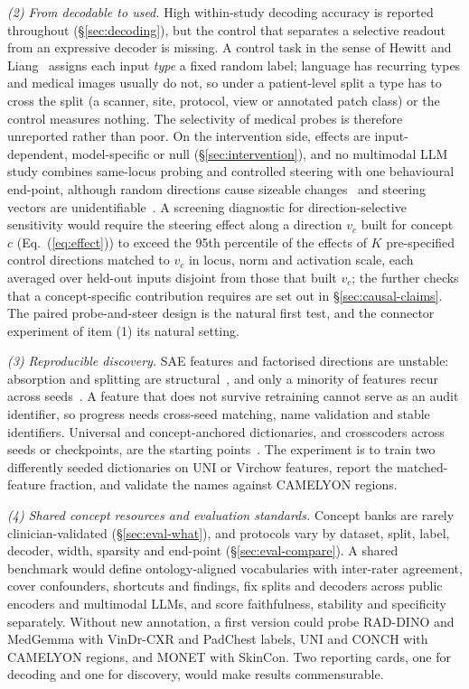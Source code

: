 \textit{(2) From decodable to used.} High within-study decoding accuracy is reported throughout
(\S\ref{sec:decoding}), but the control that separates a selective readout from an expressive decoder
is missing. A control task in the sense of Hewitt and Liang~\cite{hewitt2019designing} assigns each
input \emph{type} a fixed random label; language has recurring types and medical images usually do not,
so under a patient-level split a type has to cross the split (a scanner, site, protocol, view or
annotated patch class) or the control measures nothing. The selectivity of medical probes is therefore
unreported rather than poor. On the intervention side, effects are input-dependent, model-specific or
null (\S\ref{sec:intervention}), and no multimodal LLM study combines same-locus probing and
controlled steering with one behavioural end-point, although random directions cause sizeable
changes~\cite{korznikov2025the} and steering vectors are unidentifiable~\cite{venkatesh2026nonident}.
A screening diagnostic for direction-selective sensitivity would require the steering effect along a
direction $v_c$ built for concept $c$ (Eq.~(\ref{eq:effect})) to exceed the 95th percentile of the
effects of $K$ pre-specified control directions matched to $v_c$ in locus, norm and activation scale,
each averaged over held-out inputs disjoint from those that built $v_c$; the further checks that a
concept-specific contribution requires are set out in \S\ref{sec:causal-claims}. The paired probe-and-steer
design is the natural first test, and the connector experiment of item (1) its natural setting.

\textit{(3) Reproducible discovery.} SAE features and factorised directions are unstable: absorption and
splitting are structural~\cite{chanin2024a}, and only a minority of features recur across
seeds~\cite{paulo2025sparse,sainsbury2026sparse}. A feature that does not survive retraining cannot serve
as an audit identifier, so progress needs cross-seed matching, name validation and stable identifiers.
Universal and concept-anchored dictionaries, and crosscoders across seeds or checkpoints, are the
starting points~\cite{thasarathan2025universal,nasirisarvi2025sparc,minder2025overcoming}. The experiment
is to train two differently seeded dictionaries on UNI or Virchow features, report the matched-feature
fraction, and validate the names against CAMELYON regions.

\textit{(4) Shared concept resources and evaluation standards.} Concept banks are rarely
clinician-validated (\S\ref{sec:eval-what}), and protocols vary by dataset, split, label, decoder,
width, sparsity and end-point (\S\ref{sec:eval-compare}). A shared benchmark would define
ontology-aligned vocabularies with inter-rater agreement, cover confounders, shortcuts and findings,
fix splits and decoders across public encoders and multimodal LLMs, and score faithfulness, stability
and specificity separately. Without new annotation, a first version could probe RAD-DINO and MedGemma
with VinDr-CXR and PadChest labels, UNI and CONCH with CAMELYON regions, and MONET with SkinCon. Two
reporting cards, one for decoding and one for discovery, would make results commensurable.

